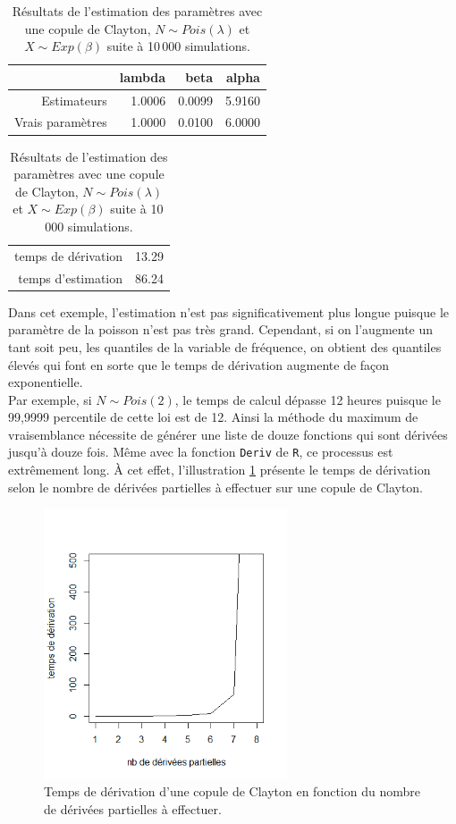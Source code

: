 \documentclass{article}
\begin{document}
	\begin{table}[H]
		\centering
		\begin{tabular}{rrrr}
			\hline
			& lambda & beta & alpha \\ 
			\hline
			Estimateurs & 1.0006 & 0.0099 & 5.9160 \\ 
			Vrais paramètres & 1.0000 & 0.0100 & 6.0000 \\ 
			\hline
		\end{tabular}
%	
	\begin{tabular}{rr}
		\hline
		&  \\ 
		\hline
		temps de dérivation & 13.29 \\ 
		temps d'estimation & 86.24 \\ 
		\hline
	\end{tabular}
		\caption[Estimations avec une copule de Clayton et $N\sim Poisson$]{Résultats de l'estimation des paramètres avec une copule de Clayton, $N\sim Pois(\lambda)$ et $X \sim Exp(\beta)$ suite à 10\,000 simulations.}\label{tbl_Clayton_Poisson}
	\end{table}

	Dans cet exemple, l'estimation n'est pas significativement plus longue puisque le paramètre de la poisson n'est pas très grand. Cependant, si on l'augmente un tant soit peu, les quantiles de la variable de fréquence, on obtient des quantiles élevés qui font en sorte que le temps de dérivation augmente de façon exponentielle.\\

	Par exemple, si $N \sim Pois(2)$, le temps de calcul dépasse 12 heures puisque le 99,9999 percentile de cette loi est de 12. Ainsi la méthode du maximum de vraisemblance nécessite de générer une liste de douze fonctions qui sont dérivées jusqu'à douze fois. Même avec la fonction \texttt{Deriv} de \texttt{R}, ce processus est extrêmement long. À cet effet, l'illustration \ref{graph_temps_deriv} présente le temps de dérivation selon le nombre de dérivées partielles à effectuer sur une copule de Clayton.
	
	\begin{figure}[H]
		\centering
		\includegraphics[height=8cm]{Graph/graph_temps_deriv.png}
		\caption{Temps de dérivation d'une copule de Clayton en fonction du nombre de dérivées partielles à effectuer.}
		\label{graph_temps_deriv}
	\end{figure}
	
\end{document}
